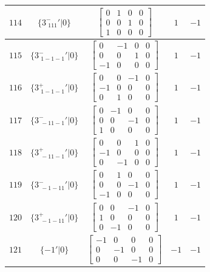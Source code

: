 \documentclass[fleqn,8pt]{jsarticle}
\begin{document}
\begin{longtable}{ccccc}
$ 114 $ & $ \{3^{-}_{\,\,111}{}'|0\} $ & $ \begin{bmatrix} 0 & 1 & 0 & 0 \\ 0 & 0 & 1 & 0 \\ 1 & 0 & 0 & 0 \end{bmatrix} $ & $ 1 $ & $ -1 $ \\ \hline
$ 115 $ & $ \{3^{-}_{\,\,1-1-1}{}'|0\} $ & $ \begin{bmatrix} 0 & -1 & 0 & 0 \\ 0 & 0 & 1 & 0 \\ -1 & 0 & 0 & 0 \end{bmatrix} $ & $ 1 $ & $ -1 $ \\ \hline
$ 116 $ & $ \{3^{+}_{\,\,1-1-1}{}'|0\} $ & $ \begin{bmatrix} 0 & 0 & -1 & 0 \\ -1 & 0 & 0 & 0 \\ 0 & 1 & 0 & 0 \end{bmatrix} $ & $ 1 $ & $ -1 $ \\ \hline
$ 117 $ & $ \{3^{-}_{\,\,-11-1}{}'|0\} $ & $ \begin{bmatrix} 0 & -1 & 0 & 0 \\ 0 & 0 & -1 & 0 \\ 1 & 0 & 0 & 0 \end{bmatrix} $ & $ 1 $ & $ -1 $ \\ \hline
$ 118 $ & $ \{3^{+}_{\,\,-11-1}{}'|0\} $ & $ \begin{bmatrix} 0 & 0 & 1 & 0 \\ -1 & 0 & 0 & 0 \\ 0 & -1 & 0 & 0 \end{bmatrix} $ & $ 1 $ & $ -1 $ \\ \hline
$ 119 $ & $ \{3^{-}_{\,\,-1-11}{}'|0\} $ & $ \begin{bmatrix} 0 & 1 & 0 & 0 \\ 0 & 0 & -1 & 0 \\ -1 & 0 & 0 & 0 \end{bmatrix} $ & $ 1 $ & $ -1 $ \\ \hline
$ 120 $ & $ \{3^{+}_{\,\,-1-11}{}'|0\} $ & $ \begin{bmatrix} 0 & 0 & -1 & 0 \\ 1 & 0 & 0 & 0 \\ 0 & -1 & 0 & 0 \end{bmatrix} $ & $ 1 $ & $ -1 $ \\ \hline
$ 121 $ & $ \{-1{}'|0\} $ & $ \begin{bmatrix} -1 & 0 & 0 & 0 \\ 0 & -1 & 0 & 0 \\ 0 & 0 & -1 & 0 \end{bmatrix} $ & $ -1 $ & $ -1 $ \\ \hline

\end{longtable}
\end{document}
